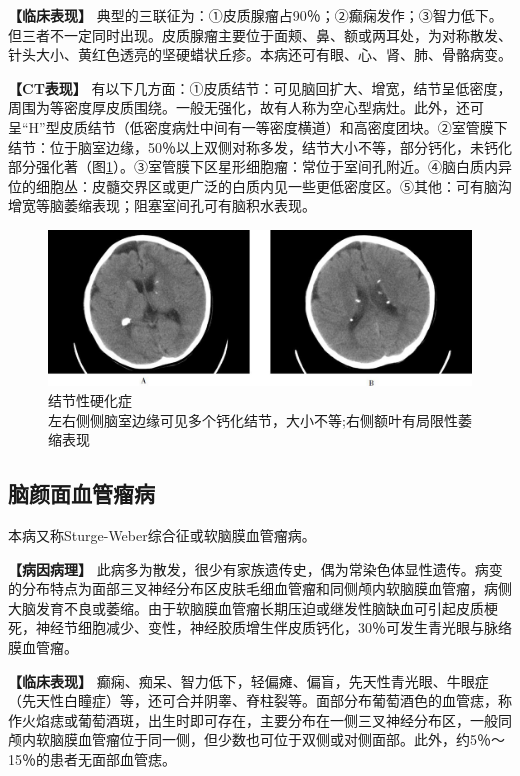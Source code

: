 \textbf{【临床表现】}
典型的三联征为：①皮质腺瘤占90％；②癫痫发作；③智力低下。但三者不一定同时出现。皮质腺瘤主要位于面颊、鼻、额或两耳处，为对称散发、针头大小、黄红色透亮的坚硬蜡状丘疹。本病还可有眼、心、肾、肺、骨骼病变。

\textbf{【CT表现】}
有以下几方面：①皮质结节：可见脑回扩大、增宽，结节呈低密度，周围为等密度厚皮质围绕。一般无强化，故有人称为空心型病灶。此外，还可呈“H”型皮质结节（低密度病灶中间有一等密度横道）和高密度团块。②室管膜下结节：位于脑室边缘，50％以上双侧对称多发，结节大小不等，部分钙化，未钙化部分强化著（图\ref{fig2-11}）。③室管膜下区星形细胞瘤：常位于室间孔附近。④脑白质内异位的细胞丛：皮髓交界区或更广泛的白质内见一些更低密度区。⑤其他：可有脑沟增宽等脑萎缩表现；阻塞室间孔可有脑积水表现。

\begin{figure}[!htbp]
 \centering
 \includegraphics[width=.7\textwidth,height=\textheight,keepaspectratio]{./images/Image00027.jpg}
 \captionsetup{justification=centering}
 \caption{结节性硬化症\\ {\small 左右侧侧脑室边缘可见多个钙化结节，大小不等;右侧额叶有局限性萎缩表现}}
 \label{fig2-11}
  \end{figure} 



\subsection{脑颜面血管瘤病}

本病又称Sturge-Weber综合征或软脑膜血管瘤病。

\textbf{【病因病理】}
此病多为散发，很少有家族遗传史，偶为常染色体显性遗传。病变的分布特点为面部三叉神经分布区皮肤毛细血管瘤和同侧颅内软脑膜血管瘤，病侧大脑发育不良或萎缩。由于软脑膜血管瘤长期压迫或继发性脑缺血可引起皮质梗死，神经节细胞减少、变性，神经胶质增生伴皮质钙化，30％可发生青光眼与脉络膜血管瘤。

\textbf{【临床表现】}
癫痫、痴呆、智力低下，轻偏瘫、偏盲，先天性青光眼、牛眼症（先天性白瞳症）等，还可合并阴睾、脊柱裂等。面部分布葡萄酒色的血管痣，称作火焰痣或葡萄酒斑，出生时即可存在，主要分布在一侧三叉神经分布区，一般同颅内软脑膜血管瘤位于同一侧，但少数也可位于双侧或对侧面部。此外，约5％～15％的患者无面部血管痣。

